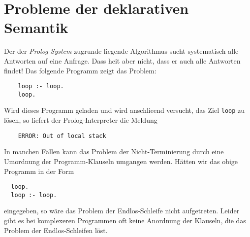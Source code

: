 \section{Probleme der deklarativen Semantik}
Der der \textsl{Prolog-System} zugrunde liegende Algorithmus sucht systematisch alle
Antworten auf eine Anfrage.  Dass hei\3t aber nicht,
dass er auch alle Antworten  findet!   Das folgende Programm zeigt das Problem:
\begin{verbatim}
    loop :- loop.
    loop.
\end{verbatim}
Wird dieses Programm geladen und wird anschlie\3end versucht, das Ziel \texttt{loop} zu
l\"{o}sen, so liefert der Prolog-Interpreter die Meldung
\begin{verbatim}
    ERROR: Out of local stack
\end{verbatim}

In manchen F\"{a}llen kann  das Problem der Nicht-Terminierung 
 durch eine Umordnung der Programm-Klauseln umgangen werden.
H\"{a}tten wir das obige Programm in  der Form
\begin{verbatim}
  loop.
  loop :- loop.
\end{verbatim}
eingegeben, so w\"{a}re das Problem der Endlos-Schleife nicht aufgetreten.  Leider gibt es bei
komplexeren Programmen oft keine Anordnung der Klauseln, die das Problem der
Endlos-Schleifen l\"{o}st.  

